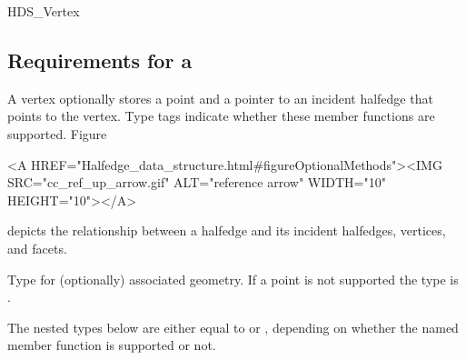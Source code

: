 \begin{ccClass}{HDS_Vertex}
\subsection{Requirements for a \protect{}}
\label{sectionHdsVertex}


\ccDefinition

A vertex optionally stores a point and a pointer to an incident
halfedge that points to the vertex.  Type tags indicate whether these
member functions are supported.  
Figure~\ccTexHtml{\ref{figureOptionalMethods}}{}\begin{ccHtmlOnly}
  <A HREF="Halfedge_data_structure.html#figureOptionalMethods"><IMG 
  SRC="cc_ref_up_arrow.gif" ALT="reference arrow" WIDTH="10" HEIGHT="10"></A>
\end{ccHtmlOnly}
depicts the relationship between a halfedge and its incident halfedges,
vertices, and facets.

\ccThreeToTwo

\ccTypes

\ccGlue
{}
\ccGlue
{}

\newpage
Type for (optionally) associated geometry. If a
point is not supported the type is .



\ccOperations

\ccGlue
{}
\ccGlue
{}
\ccGlue
{}




The nested types below are either equal to  or
, depending on whether the named member function is
supported or not. 

\ccGlue
{}

\end{ccClass}



